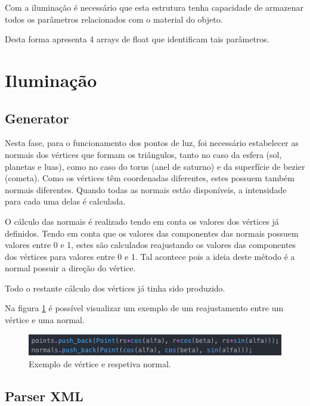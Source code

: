 \documentclass[a4paper]{article}
\begin{document}
Com a iluminação é necessário que esta estrutura tenha capacidade de armazenar todos os parâmetros relacionados com o material do objeto.

Desta forma apresenta 4 arrays de float que identificam tais parâmetros.



\section{Iluminação}
\label{sec:iluminacao}

\subsection{Generator}
\label{sec:generatori}

Nesta fase, para o funcionamento dos pontos de luz, foi necessário estabelecer as normais dos vértices que formam os triângulos, tanto no caso da esfera (sol, planetas e luas), como no caso do torus (anel de saturno) e da superfície de bezier (cometa). Como os vértices têm coordenadas diferentes, estes possuem também normais diferentes. Quando todas as normais estão disponíveis, a intensidade para cada uma delas é calculada.

O cálculo das normais é realizado tendo em conta os valores dos vértices já definidos. Tendo em conta que os valores das componentes das normais possuem valores entre 0 e 1, estes são calculados reajustando os valores das componentes dos vértices para valores entre 0 e 1. Tal acontece pois a ideia deste método é a normal possuir a direção do vértice.

Todo o restante cálculo dos vértices já tinha sido produzido.

Na figura \ref{img:vertice_normal} é possível visualizar um exemplo de um reajustamento entre um vértice e uma normal.

\begin{figure}[H]
\centering
\includegraphics[scale=0.60]{vertice_normal.png}
\caption{Exemplo de vértice e respetiva normal.}
\label{img:vertice_normal}
\end{figure}

\subsection{Parser XML}
\label{sec:parseri}
\end{document}
